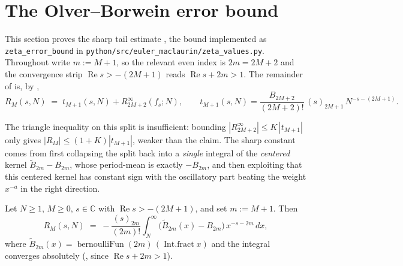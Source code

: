 \section{The Olver--Borwein error bound}
\label{sec:em_error_bound}

This section proves the sharp tail estimate , the bound
implemented as \texttt{zeta\_error\_bound} in \texttt{python/src/euler\_maclaurin/zeta\_values.py}. Throughout write
$m := M+1$, so the relevant even index is $2m = 2M+2$ and the convergence strip
$\operatorname{Re} s > -(2M+1)$ reads $\operatorname{Re} s + 2m > 1$. The remainder of
 is, by ,
\[
  R_M(s,N) \;=\; t_{M+1}(s,N) + R^{\infty}_{2M+2}(f_s; N),
  \qquad
  t_{M+1}(s,N) = \frac{B_{2M+2}}{(2M+2)!}\,(s)_{2M+1}\,N^{-s-(2M+1)} .
\]

The triangle inequality on this split is insufficient: bounding
$|R^{\infty}_{2M+2}| \le K\,|t_{M+1}|$ only gives $|R_M| \le (1+K)|t_{M+1}|$, weaker than the
claim. The sharp constant comes from first collapsing the split back into a \emph{single}
integral of the \emph{centered} kernel $\widetilde{B}_{2m} - B_{2m}$, whose period-mean is
exactly $-B_{2m}$, and then exploiting that this centered kernel has constant sign with the
oscillatory part beating the weight $x^{-a}$ in the right direction.

\begin{lemma}
\label{lem:rem_centered}
\leanok
{}
Let $N \ge 1$, $M \ge 0$, $s \in \mathbb{C}$ with $\operatorname{Re} s > -(2M+1)$, and set
$m := M+1$. Then
\[
  R_M(s,N) \;=\; -\frac{(s)_{2m}}{(2m)!}\int_N^{\infty}
      \bigl(\widetilde{B}_{2m}(x) - B_{2m}\bigr)\, x^{-s-2m}\,dx,
\]
where $\widetilde{B}_{2m}(x) = \operatorname{bernoulliFun}(2m)\,(\operatorname{Int.fract} x)$ and
the integral converges absolutely (, since
$\operatorname{Re} s + 2m > 1$).
\end{lemma}

